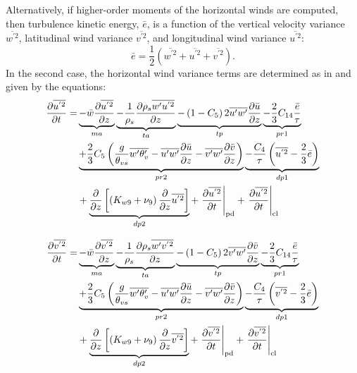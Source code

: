 \documentclass[11pt,fleqn]{article}
\newcommand{\ptlder}[2]{\frac{\partial #1}{\partial #2}}
\newcommand{\inverse}[1]{\frac{1}{#1}}
\begin{document}
Alternatively, if higher-order moments of the horizontal winds are computed, 
then turbulence kinetic energy, $\bar{e}$, is a function of the vertical 
velocity variance $\overline{w^{'2}}$, 
latitudinal wind variance $\overline{v^{'2}}$, and 
longitudinal wind variance $\overline{u^{'2}}$:
%
\begin{equation}
\label{eq_aniso_tke}
\bar{e} = \frac{1}{2} 
  \left( 
    \overline{w^{'2}}+\overline{u^{'2}}+\overline{v^{'2}}
  \right).
\end{equation}
%
In the second case, the horizontal wind variance terms are determined as in 
\citet{bougeault1981a} and given by the equations:
%
\begin{equation}
\begin{split}
\label{eq_up2}
\ptlder{\overline{u^{'2}}}{t}
= & \underbrace{ - \bar{w}\ptlder{\overline{u^{'2}}}{z} }_{ma}
    \underbrace{ - \inverse{\rho_{s}}\ptlder{\rho_{s}\overline{w'u^{'2}}}{z} }_{ta}
    \underbrace{ - \left(1 - C_{5} \right) 2\overline{u'w'}\ptlder{\bar{u}}{z} }_{tp}
    \underbrace{ - \frac{2}{3} 
                  C_{14} \frac{\bar{e}}{\tau}
               }_{pr1} \\
    & \underbrace{ + \frac{2}{3} C_{5}
      \left(
        \frac{g}{\theta_{vs}} \overline{w'\theta'_v} 
        - \overline{u'w'}\ptlder{\bar{u}}{z} 
        - \overline{v'w'}\ptlder{\bar{v}}{z} 
      \right) }_{pr2}
    \underbrace{ - \dfrac{C_4}{\tau} \left( \overline{u^{'2}} - \frac{2}{3} \bar{e} \right) }_{dp1} \\
    & + \underbrace{ \ptlder{}{z} \left[ \left( K_{w9} + \nu_9 \right)
                          \ptlder{}{z} \overline{u^{'2}} 
                   \right] }_{dp2}
    + \left. \ptlder{\overline{u^{'2}}}{t} \right|_{\rm{pd}}
    + \left. \ptlder{\overline{u^{'2}}}{t} \right|_{\rm{cl}}
\end{split}
\end{equation}
%

%
\begin{equation}
\begin{split}
\label{eq_vp2}
\ptlder{\overline{v^{'2}}}{t}
= & \underbrace{ - \bar{w}\ptlder{\overline{v^{'2}}}{z} }_{ma}
    \underbrace{ - \inverse{\rho_{s}}\ptlder{\rho_{s}\overline{w'v^{'2}}}{z} }_{ta}
    \underbrace{ - \left(1 - C_{5} \right) 2\overline{v'w'}\ptlder{\bar{v}}{z} }_{tp}
    \underbrace{ - \frac{2}{3} 
                  C_{14} \frac{\bar{e}}{\tau}
               }_{pr1} \\
    & \underbrace{ + \frac{2}{3} C_{5}
      \left(
        \frac{g}{\theta_{vs}} \overline{w'\theta'_v} 
        - \overline{u'w'}\ptlder{\bar{u}}{z} 
        - \overline{v'w'}\ptlder{\bar{v}}{z} 
      \right) }_{pr2}
     \underbrace{ - \dfrac{C_4}{\tau} \left( \overline{v^{'2}} - \frac{2}{3} \bar{e} \right) }_{dp1} \\
    & + \underbrace{ \ptlder{}{z} \left[ \left( K_{w9} + \nu_9 \right)
                          \ptlder{}{z} \overline{v^{'2}} 
                   \right] }_{dp2}
    + \left. \ptlder{\overline{v^{'2}}}{t} \right|_{\rm{pd}}
    + \left. \ptlder{\overline{v^{'2}}}{t} \right|_{\rm{cl}}
\end{split}
\end{equation}
%
\end{document}
